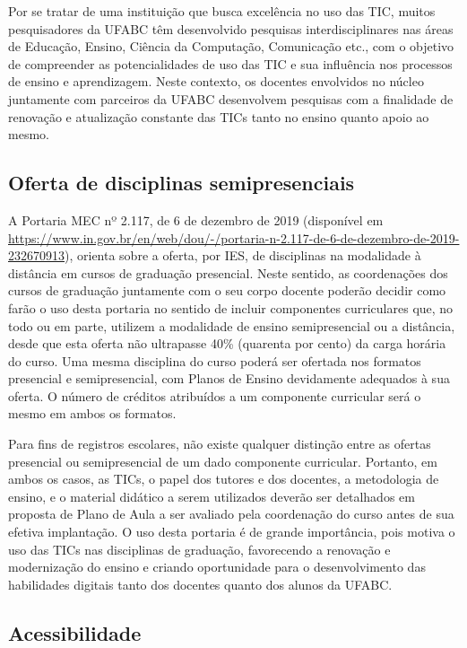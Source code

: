 Por se tratar de uma instituição que busca excelência no uso das TIC, muitos
pesquisadores da UFABC têm desenvolvido pesquisas interdisciplinares nas áreas
de Educação, Ensino, Ciência da Computação, Comunicação etc., com o objetivo de
compreender as potencialidades de uso das TIC e sua influência nos processos de
ensino e aprendizagem. 
Neste contexto, os docentes envolvidos no núcleo juntamente com parceiros da
UFABC desenvolvem pesquisas com a finalidade de renovação e atualização
constante das TICs tanto no ensino quanto apoio ao mesmo.


\subsection{Oferta de disciplinas semipresenciais}

A Portaria MEC nº 2.117, de 6 de dezembro de 2019 (disponível em
\url{https://www.in.gov.br/en/web/dou/-/portaria-n-2.117-de-6-de-dezembro-de-2019-232670913}),
orienta sobre a oferta, por IES, de disciplinas na modalidade à distância em
cursos de graduação presencial. 
Neste sentido, as coordenações dos cursos de graduação juntamente com o seu
corpo docente poderão decidir como farão o uso desta portaria no sentido de
incluir componentes curriculares que, no todo ou em parte, utilizem a
modalidade de ensino semipresencial ou a distância, desde que esta oferta não
ultrapasse 40\% (quarenta por cento) da carga horária do curso. 
Uma mesma disciplina do curso poderá ser ofertada nos formatos presencial e
semipresencial, com Planos de Ensino devidamente adequados à sua oferta.
O número de créditos atribuídos a um componente curricular será o mesmo em
ambos os formatos. 

Para fins de registros escolares, não existe qualquer distinção entre as
ofertas presencial ou semipresencial de um dado componente curricular.
Portanto, em ambos os casos, as TICs, o papel dos tutores e dos docentes, a
metodologia de ensino, e o material didático a serem utilizados deverão ser
detalhados em proposta de Plano de Aula a ser avaliado pela coordenação do
curso antes de sua efetiva implantação. 
O uso desta portaria é de grande importância, pois motiva o uso das TICs nas
disciplinas de graduação, favorecendo a renovação e modernização do ensino e
criando oportunidade para o desenvolvimento das habilidades digitais tanto dos
docentes quanto dos alunos da UFABC.

\subsection{Acessibilidade}

